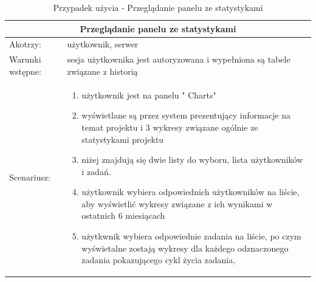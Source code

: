 \begin{table}[h!]
	\begin{tabular}{|p{2cm}||p{13cm}|  }
		


		\hline
		\multicolumn{2}{|c|}{Przeglądanie panelu ze statystykami} \\
		\hline
		Akotrzy: & użytkownik, serwer \\
		\hline
	   Warunki wstępne: & sesja użytkownika jest autoryzowana i wypełniona są tabele związane z historią \\
		\hline
		Scenariusz: &
		\begin{enumerate}
			\item użytkownik jest na panelu " Charts"
			\item wyświetlane są przez system prezentujący  informacje na temat projektu i 3 wykresy związane ogólnie ze statystykami projektu
			\item niżej znajdują się dwie listy do wyboru, lista użytkowników i zadań.
			\item użytkownik wybiera odpowiednich użytkowników na liście, aby wyświetlić wykresy związane z ich wynikami w ostatnich 6 miesiącach
			\item użytkwnik wybiera odpowiednie zadania na liście, po czym wyświetalne zostają wykresy dla każdego odznaczonego zadania pokazującego cykl życia zadania,
		\end{enumerate}\\
	\hline
	\end{tabular}
	\caption{Przypadek użycia - Przeglądanie panelu ze statystykami}
\end{table}


